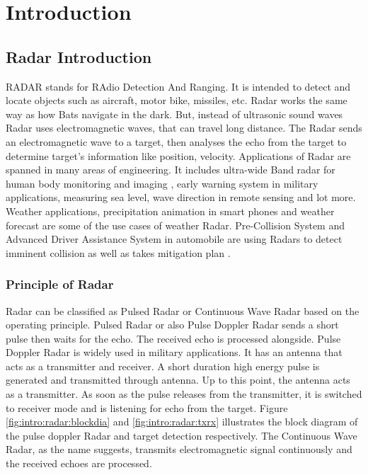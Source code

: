 \chapter{Introduction}
\label{chap:introduction}

\section{Radar Introduction}
\label{sec:intro:radarintroduction}
RADAR stands for RAdio Detection And Ranging. It is intended to detect and locate objects such as aircraft, motor bike, missiles, etc. Radar works the same way as how Bats navigate in the dark. But, instead of ultrasonic sound waves Radar uses electromagnetic waves, that can travel long distance. The Radar sends an electromagnetic wave to a target, then analyses the echo from the target to determine target's information like position, velocity. Applications of Radar are spanned in many areas of engineering. It includes ultra-wide Band radar for human body monitoring and imaging \cite{radarMedi}, early warning system in military applications, measuring sea level, wave direction in remote sensing and lot more. Weather applications, precipitation animation in smart phones and weather forecast are some of the use cases of weather Radar. Pre-Collision System and Advanced Driver Assistance System in automobile are using Radars to detect imminent collision as well as takes mitigation plan \cite{radarCollAvoid}.

\subsection{Principle of Radar}
\label{sec:intro:principleofradar}
Radar can be classified as Pulsed Radar or Continuous Wave Radar based on the operating principle. Pulsed Radar or also Pulse Doppler Radar sends a short pulse then waits for the echo. The received echo is processed alongside. Pulse Doppler Radar is widely used in military applications. It has an antenna that acts as a transmitter and receiver. A short duration high energy pulse is generated and transmitted through antenna. Up to this point, the antenna acts as a transmitter. As soon as the pulse releases from the transmitter, it is switched to receiver mode and is listening for echo from the target. Figure \ref{fig:intro:radar:blockdia} and \ref{fig:intro:radar:txrx} illustrates the block diagram of the pulse doppler Radar and target detection respectively. The Continuous Wave Radar, as the name suggests, transmits electromagnetic signal continuously and the received echoes are processed.

